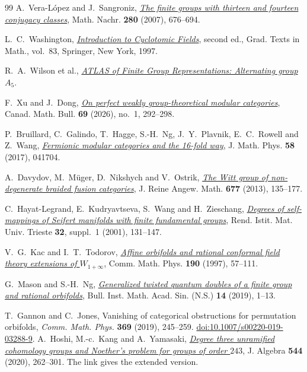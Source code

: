 \documentclass[11pt]{amsart}
\numberwithin{equation}{section}
\theoremstyle{definition}
\theoremstyle{plain}
\begin{document}
\begin{thebibliography}{99}
A.~Vera-L\'opez and J.~Sangroniz,
\href{https://doi.org/10.1002/mana.200410508}{\emph{The finite groups with thirteen and fourteen conjugacy classes}},
Math. Nachr. \textbf{280} (2007), 676--694.

L.~C.~Washington,
\href{https://doi.org/10.1007/978-1-4612-1934-7}{\emph{Introduction to
Cyclotomic Fields}}, second ed., Grad. Texts in Math., vol.~83,
Springer, New York, 1997.

R.~A.~Wilson et al.,
\href{https://brauer.maths.qmul.ac.uk/Atlas/v3/alt/A5/}{\emph{ATLAS of
Finite Group Representations: Alternating group $A_5$}}.

F.~Xu and J.~Dong,
\href{https://doi.org/10.4153/S0008439525101197}{\emph{On perfect weakly group-theoretical modular categories}},
Canad. Math. Bull. \textbf{69} (2026), no.~1, 292--298.

P.~Bruillard, C.~Galindo, T.~Hagge, S.-H.~Ng, J.~Y.~Plavnik, E.~C.~Rowell
and Z.~Wang, \href{https://doi.org/10.1063/1.4982048}{\emph{Fermionic modular
categories and the 16-fold way}}, J. Math. Phys. \textbf{58} (2017), 041704.

A.~Davydov, M.~M\"uger, D.~Nikshych and V.~Ostrik,
\href{https://arxiv.org/abs/1009.2117}{\emph{The Witt group of non-degenerate
braided fusion categories}}, J. Reine Angew. Math. \textbf{677} (2013), 135--177.

C.~Hayat-Legrand, E.~Kudryavtseva, S.~Wang and H.~Zieschang,
\href{https://rendiconti.dmi.units.it/volumi/32s1/08.pdf}{\emph{Degrees of
self-mappings of Seifert manifolds with finite fundamental groups}},
Rend. Istit. Mat. Univ. Trieste \textbf{32}, suppl.~1 (2001), 131--147.

V.~G.~Kac and I.~T.~Todorov,
\href{https://arxiv.org/abs/hep-th/9612078}{\emph{Affine orbifolds and rational
conformal field theory extensions of $W_{1+\infty}$}},
Comm. Math. Phys. \textbf{190} (1997), 57--111.

G.~Mason and S.-H.~Ng,
\href{https://doi.org/10.21915/BIMAS.2019101}{\emph{Generalized twisted
quantum doubles of a finite group and rational orbifolds}},
Bull. Inst. Math. Acad. Sin. (N.S.) \textbf{14} (2019), 1--13.

T.~Gannon and C.~Jones,
Vanishing of categorical obstructions for permutation orbifolds,
\emph{Comm. Math. Phys.} \textbf{369} (2019), 245--259.
\href{https://doi.org/10.1007/s00220-019-03288-9}{doi:10.1007/s00220-019-03288-9}.
A.~Hoshi, M.-c.~Kang and A.~Yamasaki,
\href{https://arxiv.org/abs/1710.01958}{\emph{Degree three unramified cohomology groups and Noether's problem for groups of order $243$}},
J. Algebra \textbf{544} (2020), 262--301. The link gives the extended version.


\end{thebibliography}
\end{document}
